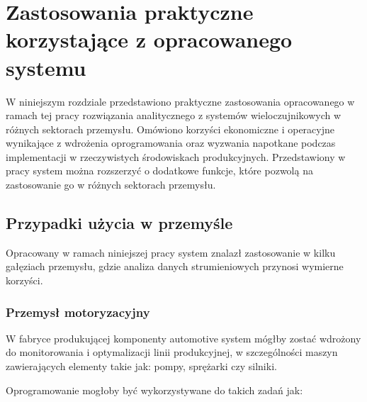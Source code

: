 \section{Zastosowania praktyczne korzystające z opracowanego systemu}
\label{sec:zastosowania_praktyczne}

W niniejszym rozdziale przedstawiono praktyczne zastosowania opracowanego w ramach tej pracy rozwiązania analitycznego z
systemów wieloczujnikowych w różnych sektorach przemysłu. Omówiono korzyści ekonomiczne i operacyjne wynikające z wdrożenia oprogramowania
oraz wyzwania napotkane podczas implementacji w rzeczywistych środowiskach produkcyjnych. Przedstawiony w pracy system można rozszerzyć o dodatkowe funkcje, które pozwolą na zastosowanie go w różnych sektorach przemysłu.

\subsection{Przypadki użycia w przemyśle}
\label{subsec:przypadki_uzycia}

Opracowany w ramach niniejszej pracy system znalazł zastosowanie w kilku gałęziach przemysłu, gdzie analiza danych strumieniowych przynosi wymierne korzyści.

\subsubsection{Przemysł motoryzacyjny}
\label{subsubsec:przemysl_motoryzacyjny}

W fabryce produkującej komponenty automotive system mógłby zostać wdrożony do monitorowania i optymalizacji linii produkcyjnej, w szczególności maszyn zawierających elementy takie jak: pompy, sprężarki czy silniki. 

\vspace{0.3em}

Oprogramowanie mogłoby być wykorzystywane do takich zadań jak:


